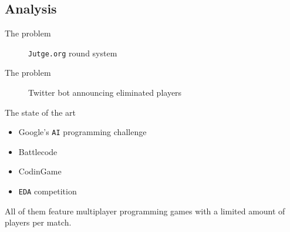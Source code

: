 \documentclass{beamer}
\begin{document}
\subsection{Analysis}
\begin{frame}{The problem}
\begin{figure}[H]
\begin{center}
\noindent{}
\end{center}
\caption{\texttt{Jutge.org} round system}
\end{figure}
\end{frame}
\begin{frame}{The problem}
\begin{figure}[H]
\begin{center}
\noindent{}
\end{center}
\caption{Twitter bot announcing eliminated players}
\end{figure}
\end{frame}
\begin{frame}{The state of the art}
\begin{itemize}
\item
Google's \texttt{AI} programming challenge
\item
Battlecode
\item
CodinGame
\item
\texttt{EDA} competition
\end{itemize}
All of them feature multiplayer programming games with a limited amount of players per match.
\end{frame}
\end{document}
